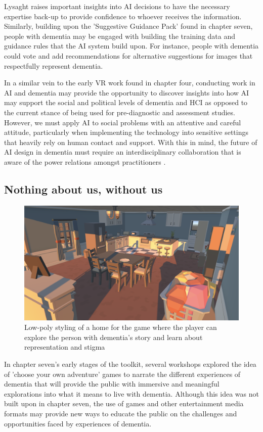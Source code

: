 Lysaght raises important insights into AI decisions to have the necessary expertise back-up to provide confidence to whoever receives the information. Similarly, building upon the 'Suggestive Guidance Pack' found in chapter seven, people with dementia may be engaged with building the training data and guidance rules that the AI system build upon. For instance, people with dementia could vote and add recommendations for alternative suggestions for images that respectfully represent dementia.

In a similar vein to the early VR work found in chapter four, conducting work in AI and dementia may provide the opportunity to discover insights into how AI may support the social and political levels of dementia and HCI as opposed to the current stance of being used for pre-diagnostic and assessment studies. However, we must apply AI to social problems with an attentive and careful attitude, particularly when implementing the technology into sensitive settings that heavily rely on human contact and support. With this in mind, the future of AI design in dementia must require an interdisciplinary collaboration that is aware of the power relations amongst practitioners \citep{berridge2022design}.

\subsection{Nothing about us, without us}
\label{FutureStudyFour}
\begin{figure}[htp]
\centering
\includegraphics[width=1\linewidth]{Images/Discussion/Storytellling_Game.png}
\caption{Low-poly styling of a home for the game where the player can explore the person with dementia's story and learn about representation and stigma}
\label{fig:StorytellingLowPoly}
\end{figure}
In chapter seven's early stages of the toolkit, several workshops explored the idea of 'choose your own adventure' games to narrate the different experiences of dementia that will provide the public with immersive and meaningful explorations into what it means to live with dementia. Although this idea was not built upon in chapter seven, the use of games and other entertainment media formats may provide new ways to educate the public on the challenges and opportunities faced by experiences of dementia. 

